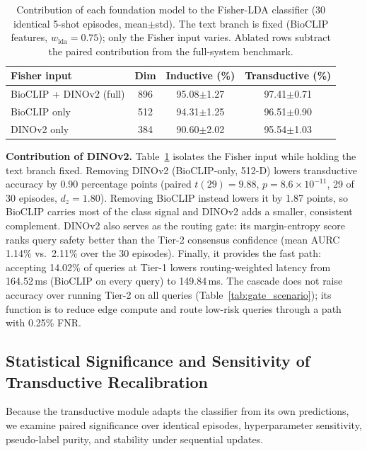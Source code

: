 \documentclass[preprint,12pt]{elsarticle}
\begin{document}
\begin{table}[htbp]
\centering
\caption{Contribution of each foundation model to the Fisher-LDA classifier (30 identical 5-shot episodes, mean$\pm$std). The text branch is fixed (BioCLIP features, $w_{\mathrm{lda}}=0.75$); only the Fisher input varies. Ablated rows subtract the paired contribution from the full-system benchmark.}
\label{tab:feature_ablation}
\footnotesize
\setlength{\tabcolsep}{4pt}
\begin{tabular*}{\columnwidth}{@{\extracolsep{\fill}}lccc}
\toprule
\textbf{Fisher input} & \textbf{Dim} & \textbf{Inductive (\%)} & \textbf{Transductive (\%)} \\
\midrule
BioCLIP + DINOv2 (full) & 896 & 95.08$\pm$1.27 & 97.41$\pm$0.71 \\
BioCLIP only & 512 & 94.31$\pm$1.25 & 96.51$\pm$0.90 \\
DINOv2 only & 384 & 90.60$\pm$2.02 & 95.54$\pm$1.03 \\
\bottomrule
\end{tabular*}
\end{table}

\textbf{Contribution of DINOv2.} Table~\ref{tab:feature_ablation} isolates the Fisher input while holding the text branch fixed. Removing DINOv2 (BioCLIP-only, 512-D) lowers transductive accuracy by 0.90 percentage points (paired $t(29)=9.88$, $p=8.6\times10^{-11}$, 29 of 30 episodes, $d_z=1.80$). Removing BioCLIP instead lowers it by 1.87 points, so BioCLIP carries most of the class signal and DINOv2 adds a smaller, consistent complement. DINOv2 also serves as the routing gate: its margin-entropy score ranks query safety better than the Tier-2 consensus confidence (mean AURC 1.14\% vs.\ 2.11\% over the 30 episodes). Finally, it provides the fast path: accepting 14.02\% of queries at Tier-1 lowers routing-weighted latency from 164.52\,ms (BioCLIP on every query) to 149.84\,ms. The cascade does not raise accuracy over running Tier-2 on all queries (Table~\ref{tab:gate_scenario}); its function is to reduce edge compute and route low-risk queries through a path with 0.25\% FNR.

\subsection{Statistical Significance and Sensitivity of Transductive Recalibration}
\label{sec:transductive_validation}
Because the transductive module adapts the classifier from its own predictions, we examine paired significance over identical episodes, hyperparameter sensitivity, pseudo-label purity, and stability under sequential updates.
\end{document}
